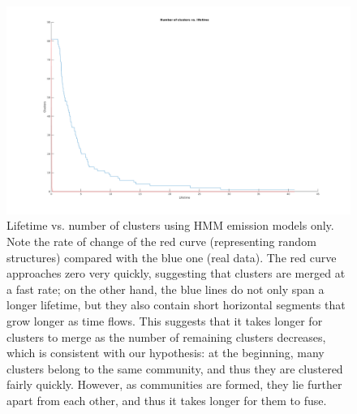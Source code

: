 \documentclass[pdftex,11pt,a4paper]{article}
\theoremstyle{definition}
\theoremstyle{remark}
\begin{document}
\begin{figure}[H]
\centering
\includegraphics[width=\textwidth]{images/random}
\caption{Lifetime vs. number of clusters using HMM emission models only. Note the rate of change of the red curve (representing random structures) compared with the blue one (real data). The red curve approaches zero very quickly, suggesting that clusters are merged at a fast rate; on the other hand, the blue lines do not only span a longer lifetime, but they also contain short horizontal segments that grow longer as time flows. This suggests that it takes longer for clusters to merge as the number of remaining clusters decreases, which is consistent with our hypothesis: at the beginning, many clusters belong to the same community, and thus they are clustered fairly quickly. However, as communities are formed, they lie further apart from each other, and thus it takes longer for them to fuse.}
\label{fig_lifetime}
\end{figure}
\end{document}
